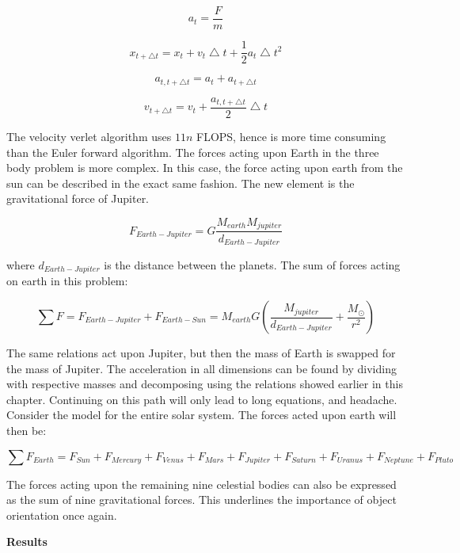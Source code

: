 \documentclass[10pt,a4paper]{article}
\begin{document}
$$a_t=\frac{F}{m}$$

$$x_{t+\bigtriangleup t}=x_t + v_t\bigtriangleup t +\frac{1}{2} a_t\bigtriangleup t^2$$

$$a_{t,t+\bigtriangleup t}=a_t + a_{t+\bigtriangleup t}$$

$$v_{t+\bigtriangleup t}=v_t + \frac{a_{t,t+\bigtriangleup t}}{2}\bigtriangleup t$$

\noindent The velocity verlet algorithm uses $11n$ FLOPS, hence is more time consuming than the Euler forward algorithm. The forces acting upon Earth in the three body problem is more complex. In this case, the force acting upon earth from the sun can be described in the exact same fashion. The new element is the gravitational force of Jupiter. 

$$F_{Earth-Jupiter}=G\frac{M_{earth}M_{jupiter}}{d_{Earth-Jupiter}}$$

\noindent where $d_{Earth-Jupiter}$ is the distance between the planets. The sum of forces acting on earth in this problem: 

$$\sum F = F_{Earth-Jupiter}+ F_{Earth-Sun}= M_{earth}G(\frac{M_{jupiter}}{d_{Earth-Jupiter}} + \frac{M_{\odot}}{r^2}) $$

\noindent The same relations act upon Jupiter, but then the mass of Earth is swapped for the mass of Jupiter. The acceleration in all dimensions can be found by dividing with respective masses and decomposing using the relations showed earlier in this chapter. Continuing on this path will only lead to long equations, and headache. Consider the model for the entire solar system. The forces acted upon earth will then be: 


$$ \sum F_{Earth}=F_{Sun}+F_{Mercury}+F_{Venus}+F_{Mars}+F_{Jupiter}+F_{Saturn}+F_{Uranus}+F_{Neptune}+F_{Pluto}$$

The forces acting upon the remaining nine celestial bodies can also be expressed as the sum of nine gravitational forces. This underlines the importance of object orientation once again.















\newpage
{\LARGE\bf
Results
}\\
\end{document}
